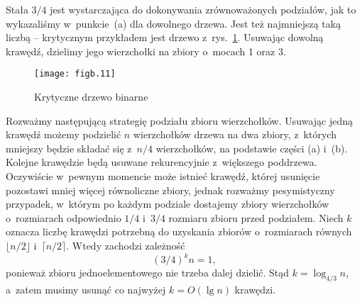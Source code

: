 \subproblem %
Stała $3/4$ jest wystarczająca do dokonywania zrównoważonych podziałów, jak to wykazaliśmy w~punkcie~(a) dla dowolnego drzewa. Jest też najmniejszą taką liczbą -- krytycznym przykładem jest drzewo z~rys.~\ref{fig:B-3b}. Usuwając dowolną krawędź, dzielimy jego wierzchołki na zbiory o~mocach 1 oraz 3.
\begin{figure}[ht]
	\begin{center}
		\texttt{[image: figb.11]}
	\end{center}
	\caption{Krytyczne drzewo binarne} \label{fig:B-3b}
\end{figure}

\subproblem %
Rozważmy następującą strategię podziału zbioru wierzchołków. Usuwając jedną krawędź możemy podzielić $n$ wierzchołków drzewa na dwa zbiory, z~których mniejszy będzie składać się z~$n/4$ wierzchołków, na podstawie części (a) i~(b). Kolejne krawędzie będą usuwane rekurencyjnie z~większego poddrzewa. Oczywiście w~pewnym momencie może istnieć krawędź, której usunięcie pozostawi mniej więcej równoliczne zbiory, jednak rozważmy pesymistyczny przypadek, w~którym po każdym podziale dostajemy zbiory wierzchołków o~rozmiarach odpowiednio $1/4$ i~$3/4$ rozmiaru zbioru przed podziałem. Niech $k$ oznacza liczbę krawędzi potrzebną do uzyskania zbiorów o~rozmiarach równych $\lfloor n/2\rfloor$ i~$\lceil n/2\rceil$. Wtedy zachodzi zależność
\[
	(3/4)^kn = 1,
\]
ponieważ zbioru jednoelementowego nie trzeba dalej dzielić. Stąd $k=\log_{4/3}n$, a~zatem musimy usunąć co najwyżej $k=O(\lg n)$ krawędzi.

\endinput
